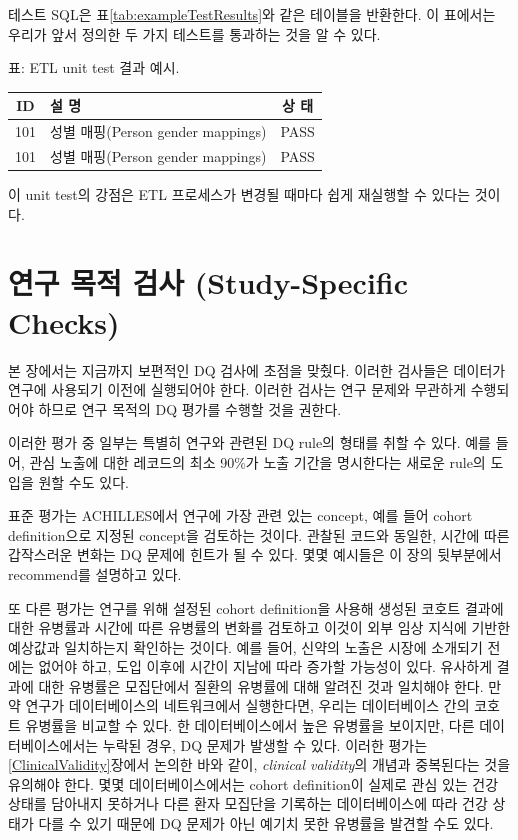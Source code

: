 \documentclass[11pt]{book}
\theoremstyle{definition}
\theoremstyle{definition}
\theoremstyle{definition}
\theoremstyle{remark}
\begin{document}
테스트 SQL은 표\ref{tab:exampleTestResults}와 같은 테이블을 반환한다. 이
표에서는 우리가 앞서 정의한 두 가지 테스트를 통과하는 것을 알 수 있다.

표: \label{tab:exampleTestResults} ETL unit test 결과 예시.

\begin{longtable}[]{@{}clc@{}}
\toprule
ID & 설 명 & 상 태\tabularnewline
\midrule
\endhead
101 & 성별 매핑(Person gender mappings) & PASS\tabularnewline
101 & 성별 매핑(Person gender mappings) & PASS\tabularnewline
\bottomrule
\end{longtable}

이 unit test의 강점은 ETL 프로세스가 변경될 때마다 쉽게 재실행할 수
있다는 것이다.

\section{연구 목적 검사 (Study-Specific
Checks)}\label{---study-specific-checks}


본 장에서는 지금까지 보편적인 DQ 검사에 초점을 맞췄다. 이러한 검사들은
데이터가 연구에 사용되기 이전에 실행되어야 한다. 이러한 검사는 연구
문제와 무관하게 수행되어야 하므로 연구 목적의 DQ 평가를 수행할 것을
권한다.

이러한 평가 중 일부는 특별히 연구와 관련된 DQ rule의 형태를 취할 수
있다. 예를 들어, 관심 노출에 대한 레코드의 최소 90\%가 노출 기간을
명시한다는 새로운 rule의 도입을 원할 수도 있다.

표준 평가는 ACHILLES에서 연구에 가장 관련 있는 concept, 예를 들어 cohort
definition으로 지정된 concept을 검토하는 것이다. 관찰된 코드와 동일한,
시간에 따른 갑작스러운 변화는 DQ 문제에 힌트가 될 수 있다. 몇몇 예시들은
이 장의 뒷부분에서 recommend를 설명하고 있다.

또 다른 평가는 연구를 위해 설정된 cohort definition을 사용해 생성된
코호트 결과에 대한 유병률과 시간에 따른 유병률의 변화를 검토하고 이것이
외부 임상 지식에 기반한 예상값과 일치하는지 확인하는 것이다. 예를 들어,
신약의 노출은 시장에 소개되기 전에는 없어야 하고, 도입 이후에 시간이
지남에 따라 증가할 가능성이 있다. 유사하게 결과에 대한 유병률은
모집단에서 질환의 유병률에 대해 알려진 것과 일치해야 한다. 만약 연구가
데이터베이스의 네트워크에서 실행한다면, 우리는 데이터베이스 간의 코호트
유병률을 비교할 수 있다. 한 데이터베이스에서 높은 유병률을 보이지만,
다른 데이터베이스에서는 누락된 경우, DQ 문제가 발생할 수 있다. 이러한
평가는 \ref{ClinicalValidity}장에서 논의한 바와 같이, \emph{clinical
validity}의 개념과 중복된다는 것을 유의해야 한다. 몇몇
데이터베이스에서는 cohort definition이 실제로 관심 있는 건강 상태를
담아내지 못하거나 다른 환자 모집단을 기록하는 데이터베이스에 따라 건강
상태가 다를 수 있기 때문에 DQ 문제가 아닌 예기치 못한 유병률을 발견할
수도 있다.
\end{document}

